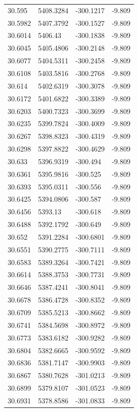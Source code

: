 \begin{table}[H]
\begin{tabular}{llll}
30.595 & 5408.3284 & -300.1217 & -9.809 \\
30.5982 & 5407.3792 & -300.1527 & -9.809 \\
30.6014 & 5406.43 & -300.1838 & -9.809 \\
30.6045 & 5405.4806 & -300.2148 & -9.809 \\
30.6077 & 5404.5311 & -300.2458 & -9.809 \\
30.6108 & 5403.5816 & -300.2768 & -9.809 \\
30.614 & 5402.6319 & -300.3078 & -9.809 \\
30.6172 & 5401.6822 & -300.3389 & -9.809 \\
30.6203 & 5400.7323 & -300.3699 & -9.809 \\
30.6235 & 5399.7824 & -300.4009 & -9.809 \\
30.6267 & 5398.8323 & -300.4319 & -9.809 \\
30.6298 & 5397.8822 & -300.4629 & -9.809 \\
30.633 & 5396.9319 & -300.494 & -9.809 \\
30.6361 & 5395.9816 & -300.525 & -9.809 \\
30.6393 & 5395.0311 & -300.556 & -9.809 \\
30.6425 & 5394.0806 & -300.587 & -9.809 \\
30.6456 & 5393.13 & -300.618 & -9.809 \\
30.6488 & 5392.1792 & -300.649 & -9.809 \\
30.652 & 5391.2284 & -300.6801 & -9.809 \\
30.6551 & 5390.2775 & -300.7111 & -9.809 \\
30.6583 & 5389.3264 & -300.7421 & -9.809 \\
30.6614 & 5388.3753 & -300.7731 & -9.809 \\
30.6646 & 5387.4241 & -300.8041 & -9.809 \\
30.6678 & 5386.4728 & -300.8352 & -9.809 \\
30.6709 & 5385.5213 & -300.8662 & -9.809 \\
30.6741 & 5384.5698 & -300.8972 & -9.809 \\
30.6773 & 5383.6182 & -300.9282 & -9.809 \\
30.6804 & 5382.6665 & -300.9592 & -9.809 \\
30.6836 & 5381.7147 & -300.9903 & -9.809 \\
30.6867 & 5380.7628 & -301.0213 & -9.809 \\
30.6899 & 5379.8107 & -301.0523 & -9.809 \\
30.6931 & 5378.8586 & -301.0833 & -9.809 \\

\end{tabular}
\end{table}
